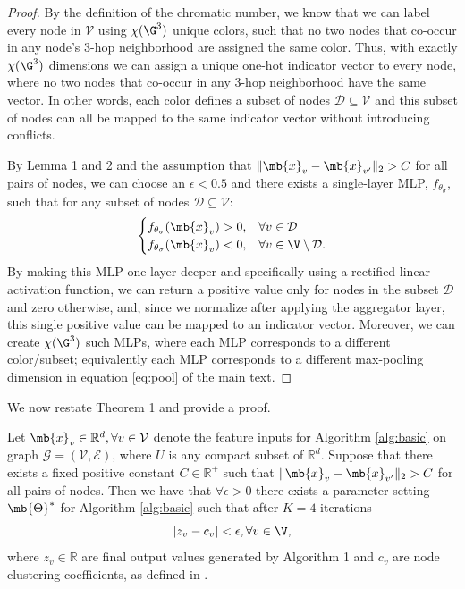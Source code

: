 \begin{proof}
By the definition of the chromatic number, we know that we can label every node in $\mathcal{V}$ using $\chi(\G^3)$ unique colors, such that no two nodes that co-occur in any node's 3-hop neighborhood are assigned the same color. 
Thus, with exactly $\chi(\G^3)$ dimensions we can assign a unique one-hot indicator vector to every node, where no two nodes that co-occur in any 3-hop neighborhood have the same vector. 
In other words, each color defines a subset of nodes $\mathcal{D} \subseteq \mathcal{V}$ and this subset of nodes can all be mapped to the same indicator vector without introducing conflicts. 

By Lemma 1 and 2 and the assumption that $\|\mb{x}_v  - \mb{x}_{v'}\|_2 > C$ for all pairs of nodes, we can choose an $\epsilon < 0.5$ and there exists a single-layer MLP, $f_{\theta_\sigma}$, such that for any subset of nodes $\mathcal{D} \subseteq \mathcal{V}$:
\begin{equation}
\begin{cases}
f_{\theta_\sigma}(\mb{x}_v) > 0 ,&\forall v \in \mathcal{D}\\
f_{\theta_\sigma}(\mb{x}_v) < 0,& \forall v \in \V \setminus \mathcal{D}.
\end{cases}
\end{equation}
By making this MLP one layer deeper and specifically using a rectified linear activation function, we can return a positive value only for nodes in the subset $\mathcal{D}$ and zero otherwise, and, since we normalize after applying the aggregator layer, this single positive value can be mapped to an indicator vector. 
Moreover, we can create $\chi(\G^3)$ such MLPs, where each MLP corresponds to a different color/subset; equivalently each MLP corresponds to a different max-pooling dimension in equation \ref{eq:pool} of the main text. 
\end{proof}



We now restate Theorem 1 and provide a proof. 

\renewcommand{\thetheorem}{\ref{thm:main}}
\begin{theorem}
Let $\mb{x}_v \in \mathbb{R}^d, \forall v \in \mathcal{V}$ denote the feature inputs for Algorithm \ref{alg:basic} on graph $\mathcal{G}=(\mathcal{V}, \mathcal{E})$, where $U$ is any compact subset of $\mathbb{R}^d$. Suppose that there exists a fixed positive constant $C \in \mathbb{R}^+$ such that $\|\mb{x}_v  - \mb{x}_{v'}\|_2 > C$ for all pairs of nodes. Then we have that $\forall \epsilon > 0$ there exists a parameter setting $\mb{\Theta}^*$ for Algorithm \ref{alg:basic} such that after $K=4$ iterations 
$$|{z}_v - c_v| < \epsilon , \forall v \in \mathcal{\V},$$ where $z_v \in \mathbb{R}$ are final output values generated by Algorithm 1 and $c_v$ are node clustering coefficients, as defined in \cite{watts1998collective}. 
\end{theorem}

